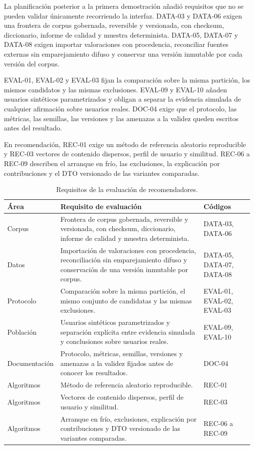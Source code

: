La planificación posterior a la primera demostración añadió requisitos que no se pueden
validar únicamente recorriendo la interfaz. DATA-03 y DATA-06 exigen una frontera de corpus
gobernada, reversible y versionada, con checksum, diccionario, informe de calidad y muestra
determinista. DATA-05, DATA-07 y DATA-08 exigen importar valoraciones con procedencia, reconciliar
fuentes externas sin emparejamiento difuso y conservar una versión inmutable por cada versión del corpus.

EVAL-01, EVAL-02 y EVAL-03 fijan la comparación sobre la misma partición, los mismos
candidatos y las mismas exclusiones. EVAL-09 y EVAL-10 añaden usuarios sintéticos
parametrizados y obligan a separar la evidencia simulada de cualquier afirmación sobre
usuarios reales. DOC-04 exige que el protocolo, las métricas, las semillas, las versiones y
las amenazas a la validez queden escritos antes del resultado.

En recomendación, REC-01 exige un método de referencia aleatorio reproducible y REC-03 vectores de
contenido dispersos, perfil de usuario y similitud. REC-06 a REC-09 describen el arranque en frío,
las exclusiones, la explicación por contribuciones y el DTO versionado de las variantes
comparadas.

\begin{table}[H]
\centering
\tablecompact
\begin{tabularx}{\textwidth}{ | L{0.20\textwidth} | Y | L{0.20\textwidth} | }
    \hline
    \textbf{Área} & \textbf{Requisito de evaluación} & \textbf{Códigos} \\
    \hline
    Corpus & Frontera de corpus gobernada, reversible y versionada, con checksum, diccionario, informe de calidad y muestra determinista. & DATA-03, DATA-06 \\
    \hline
    Datos & Importación de valoraciones con procedencia, reconciliación sin emparejamiento difuso y conservación de una versión inmutable por corpus. & DATA-05, DATA-07, DATA-08 \\
    \hline
    Protocolo & Comparación sobre la misma partición, el mismo conjunto de candidatas y las mismas exclusiones. & EVAL-01, EVAL-02, EVAL-03 \\
    \hline
    Población & Usuarios sintéticos parametrizados y separación explícita entre evidencia simulada y conclusiones sobre usuarios reales. & EVAL-09, EVAL-10 \\
    \hline
    Documentación & Protocolo, métricas, semillas, versiones y amenazas a la validez fijados antes de conocer los resultados. & DOC-04 \\
    \hline
    Algoritmos & Método de referencia aleatorio reproducible. & REC-01 \\
    \hline
    Algoritmos & Vectores de contenido dispersos, perfil de usuario y similitud. & REC-03 \\
    \hline
    Algoritmos & Arranque en frío, exclusiones, explicación por contribuciones y DTO versionado de las variantes comparadas. & REC-06 a REC-09 \\
    \hline
\end{tabularx}
\caption{Requisitos de la evaluación de recomendadores.}
\label{tab:req-estudio}
\end{table}


